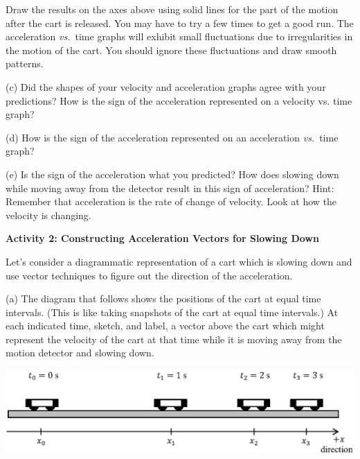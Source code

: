 Draw the results on the axes above using solid lines for the part of the motion
after the cart is released. You may have to try a few times to get a good run.  The acceleration \textit{vs.}~time graphs will exhibit small fluctuations due to irregularities in the motion of the cart. You should ignore these fluctuations and draw smooth patterns.

(c) Did the shapes of your velocity and acceleration graphs agree with your
predictions? How is the sign of the acceleration represented on a velocity vs.
time graph? 
\answerspace{15mm}

(d) How is the sign of the acceleration represented on an acceleration \textit{vs.}~time
graph? 
\answerspace{15mm}

\pagebreak[3]
(e) Is the sign of the acceleration what you predicted? How does slowing down
while moving away from the detector result in this sign of acceleration? Hint:
Remember that acceleration is the rate of change of velocity. Look at how the
velocity is changing.
\answerspace{20mm}

\textbf{Activity 2: Constructing Acceleration Vectors for Slowing Down}

Let's consider a diagrammatic representation of a cart which is slowing down
and use vector techniques to figure out the direction of the acceleration.


(a) The diagram that follows shows the positions of the cart at equal time intervals.
(This is like taking snapshots of the cart at equal time intervals.) At each
indicated time, sketch, and label, a vector above the cart which might represent the velocity
of the cart at that time while it is moving away from the motion detector and
slowing down.

\vspace{0.5cm}
{\par\centering \includegraphics{slowing/carts_slowing.eps} \par}
\vspace{0.5cm}

